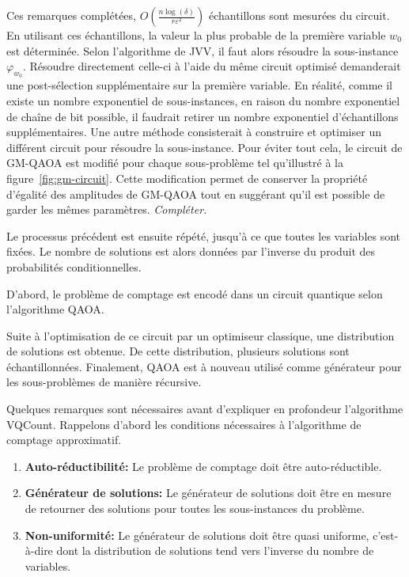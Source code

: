 Ces remarques complétées, $O(\frac{n \log (\delta)}{r \varepsilon^{2}})$ échantillons sont mesurées du circuit. En utilisant ces échantillons, la valeur la plus probable de la première variable $w_{0}$ est déterminée. Selon l'algorithme de JVV, il faut alors résoudre la sous-instance $\varphi_{w_{0}}$. Résoudre directement celle-ci à l'aide du même circuit optimisé demanderait une post-sélection supplémentaire sur la première variable. En réalité, comme il existe un nombre exponentiel de sous-instances, en raison du nombre exponentiel de chaîne de bit possible, il faudrait retirer un nombre exponentiel d'échantillons supplémentaires. Une autre méthode consisterait à construire et optimiser un différent circuit pour résoudre la sous-instance. Pour éviter tout cela, le circuit de GM-QAOA est modifié pour chaque sous-problème tel qu'illustré à la figure~\ref{fig:gm-circuit}. Cette modification permet de conserver la propriété d'égalité des amplitudes de GM-QAOA tout en suggérant qu'il est possible de garder les mêmes paramètres. \textcolor{mydarkred}{\textit{Compléter.}}

Le processus précédent est ensuite répété, jusqu'à ce que toutes les variables sont fixées. Le nombre de solutions est alors données par l'inverse du produit des probabilités conditionnelles.

D'abord, le problème de comptage est encodé dans un circuit quantique selon l'algorithme QAOA. 




Suite à l'optimisation de ce circuit par un optimiseur classique, une distribution de solutions est obtenue. De cette distribution, plusieurs solutions sont échantillonnées. Finalement, QAOA est à nouveau utilisé comme générateur pour les sous-problèmes de manière récursive.




Quelques remarques sont nécessaires avant d'expliquer en profondeur l'algorithme VQCount. Rappelons d'abord les conditions nécessaires à l'algorithme de comptage approximatif.

\begin{enumerate}[(1)]
    \item \textbf{Auto-réductibilité:} Le problème de comptage doit être auto-réductible.
    \item \textbf{Générateur de solutions:} Le générateur de solutions doit être en mesure de retourner des solutions pour toutes les sous-instances du problème.
    \item \textbf{Non-uniformité:} Le générateur de solutions doit être quasi uniforme, c'est-à-dire dont la distribution de solutions tend vers l'inverse du nombre de variables.
\end{enumerate}

